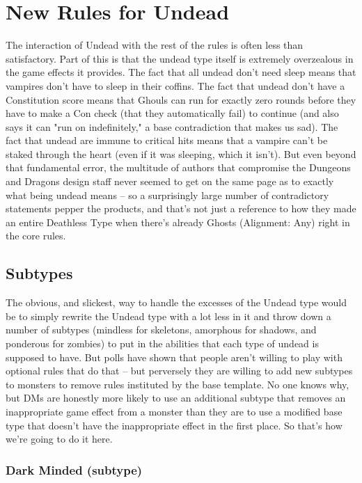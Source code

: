 \section{New Rules for Undead}

The interaction of Undead with the rest of the rules is often less than satisfactory. Part of this is that the undead type itself is extremely overzealous in the game effects it provides. The fact that all undead don't need sleep means that vampires don't have to sleep in their coffins. The fact that undead don't have a Constitution score means that Ghouls can run for exactly zero rounds before they have to make a Con check (that they automatically fail) to continue (and also says it can "run on indefinitely," a base contradiction that makes us sad). The fact that undead are immune to critical hits means that a vampire can't be staked through the heart (even if it was sleeping, which it isn't). But even beyond that fundamental error, the multitude of authors that compromise the Dungeons and Dragons design staff never seemed to get on the same page as to exactly what being undead means -- so a surprisingly large number of contradictory statements pepper the products, and that's not just a reference to how they made an entire Deathless Type when there's already Ghosts (Alignment: Any) right in the core rules.

\subsection{Subtypes}

The obvious, and slickest, way to handle the excesses of the Undead type would be to simply rewrite the Undead type with a lot less in it and throw down a number of subtypes (mindless for skeletons, amorphous for shadows, and ponderous for zombies) to put in the abilities that each type of undead is supposed to have. But polls have shown that people aren't willing to play with optional rules that do that -- but perversely they are willing to add new subtypes to monsters to remove rules instituted by the base template. No one knows why, but DMs are honestly more likely to use an additional subtype that removes an inappropriate game effect from a monster than they are to use a modified base type that doesn't have the inappropriate effect in the first place. So that's how we're going to do it here.


\subsubsection{Dark Minded (subtype)} \label{undead:darkminded}

